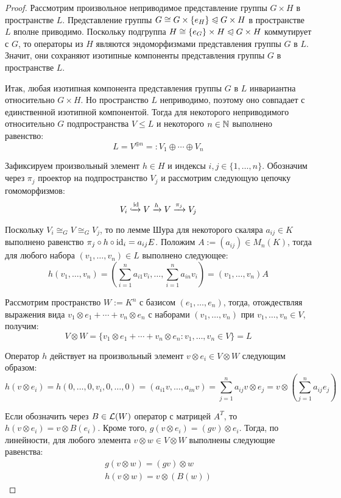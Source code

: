 \begin{proof}
	Рассмотрим произвольное неприводимое представление группы $G \times H$ в пространстве $L$. Представление группы $G \cong G \times \{e_H\} \trianglelefteqslant G \times H$ в пространстве $L$ вполне приводимо. Поскольку подгруппа $H \cong \{e_G\} \times H \trianglelefteqslant G \times H$ коммутирует с $G$, то операторы из $H$ являются эндоморфизмами представления группы $G$ в $L$. Значит, они сохраняют изотипные компоненты представления группы $G$ в пространстве $L$.
	
	Итак, любая изотипная компонента представления группы $G$ в $L$ инвариантна относительно $G \times H$. Но пространство $L$ неприводимо, поэтому оно совпадает с единственной изотипной компонентой. Тогда для некоторого неприводимого относительно $G$ подпространства $V \le L$ и некоторого $n \in \mathbb{N}$ выполнено равенство:
	\[L = V^{\oplus n} =: V_1 \oplus \dotsb \oplus V_n\]
	
	Зафиксируем произвольный элемент $h \in H$ и индексы $i, j \in \{1, \dotsc, n\}$. Обозначим через $\pi_j$ проектор на подпространство $V_j$ и рассмотрим следующую цепочку гомоморфизмов:
	\[V_i \xhookrightarrow[]{\mathrm{id}} V \xrightarrow{h} V \xrightarrow{\pi_j} V_j\]
	
	Поскольку $V_i \cong_G V \cong_G V_j$, то по лемме Шура для некоторого скаляра $a_{ij} \in K$ выполнено равенство $\pi_j \circ h \circ \mathrm{id}_i = a_{ij}E$. Положим $A := (a_{ij}) \in M_n(K)$, тогда для любого набора $(v_1, \dotsc, v_n) \in L$ выполнено следующее:
	\[h(v_1, \dotsc, v_n) = \left(\sum_{i = 1}^na_{i1}v_i, \dotsc, \sum_{i = 1}^na_{in}v_i\right) = (v_1, \dotsc, v_n)A\]
	
	Рассмотрим пространство $W := K^n$ с базисом $(e_1, \dotsc, e_n)$, тогда, отождествляя выражения вида $v_1 \otimes e_1 + \dotsb + v_n \otimes e_n$ с наборами $(v_1, \dotsc, v_n)$ при $v_1, \dotsc, v_n \in V$, получим:
	\[V \otimes W = \{v_1 \otimes e_1 + \dotsb + v_n \otimes e_n : v_1, \dotsc, v_n \in V\} = L\]
	
	Оператор $h$ действует на произвольный элемент $v \otimes e_i \in V \otimes W$ следующим образом:
	\[h(v \otimes e_i) = h(0, \dotsc, 0, v_i, 0, \dotsc, 0) = \left(a_{i1}v, \dotsc, a_{in}v\right) = \sum_{j=1}^na_{ij}v\otimes e_{j} = v \otimes \left(\sum_{j=1}^na_{ij} e_{j}\right)\]
	
	Если обозначить через $B \in \mathcal L(W)$ оператор с матрицей $A^T$, то $h(v \otimes e_i) = v \otimes B(e_i)$. Кроме того, $g(v \otimes e_i) = (gv) \otimes e_i$. Тогда, по линейности, для любого элемента $v \otimes w \in V \otimes W$ выполнены следующие равенства:
	\begin{gather*}
		g(v \otimes w) = (gv) \otimes w\\
		h(v \otimes w) = v \otimes (B(w))
	\end{gather*}


\end{proof}
